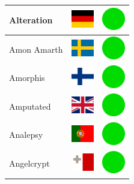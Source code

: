 \documentclass[12pt, a4paper, twoside]{report}
\begin{document}
\begin{center}
\begin{longtable}{|p{5cm}|p{2cm}|p{2cm}|}
 Alteration                                                 & \includegraphics[width=1cm]{../4x3/de} &   \includegraphics[width=1cm]{../likes/y} \\ \hline
 Amon Amarth                                                & \includegraphics[width=1cm]{../4x3/se} &   \includegraphics[width=1cm]{../likes/y} \\ \hline
 Amorphis                                                   & \includegraphics[width=1cm]{../4x3/fi} &   \includegraphics[width=1cm]{../likes/y} \\ \hline
 Amputated                                                  & \includegraphics[width=1cm]{../4x3/gb} &   \includegraphics[width=1cm]{../likes/y} \\ \hline
 Analepsy                                                   & \includegraphics[width=1cm]{../4x3/pt} &   \includegraphics[width=1cm]{../likes/y} \\ \hline
 Angelcrypt                                                 & \includegraphics[width=1cm]{../4x3/mt} &   \includegraphics[width=1cm]{../likes/y} \\ \hline

\end{longtable}
\end{center}
\end{document}

